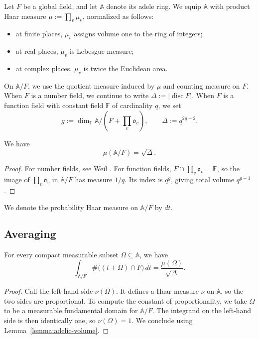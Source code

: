\documentclass[reqno]{amsart} 
\begin{document}
Let $F$ be a global field, and let $\mathbb{A}$ denote its adele ring.  We equip $\mathbb{A}$ with product Haar measure $\mu := \prod_v \mu_v$, normalized as follows:
\begin{itemize}
\item at finite places, $\mu_v$ assigns volume one to the ring of integers;
\item at real places, $\mu_v$ is Lebesgue measure;
\item at complex places, $\mu_v$ is twice the Euclidean area.
\end{itemize}
On $\mathbb{A}/F$, we use the quotient measure induced by $\mu$ and counting measure on $F$.  When $F$ is a number field, we continue to write $\Delta:=|\operatorname{disc}F|$.  When $F$ is a function field with constant field $\mathbb{F}$ of cardinality $q$, we set
\begin{equation*}
  g:=\dim_{\mathbb{F}}\mathbb{A}/\left(F+\prod_v\mathfrak{o}_v\right),
  \qquad \Delta:=q^{2g-2}.
\end{equation*}
\begin{lemma}\label{lemma:adelic-volume}
  We have
  \begin{equation*}
    \mu(\mathbb{A}/F) = \sqrt{\Delta}.
  \end{equation*}
\end{lemma}
\begin{proof}
  For number fields, see Weil \cite[\S2.1.3]{MR670072}.  For function fields, $F\cap\prod_v\mathfrak{o}_v=\mathbb{F}$, so the image of $\prod_v\mathfrak{o}_v$ in $\mathbb{A}/F$ has measure $1/q$.  Its index is $q^g$, giving total volume $q^{g-1}$.
\end{proof}
We denote the probability Haar measure on $\mathbb{A}/F$ by $dt$.

\subsection{Averaging}\label{sec:cus71nhke1}

\begin{lemma}\label{lemma:adelic-averaging}
  For every compact measurable subset $\Omega \subseteq \mathbb{A}$, we have
  \begin{equation*}
    \int_{\mathbb{A}/F}\#\bigl((t + \Omega) \cap F\bigr) \, d t
    = \frac{\mu(\Omega)}{\sqrt\Delta}.
  \end{equation*}
\end{lemma}
\begin{proof}
  Call the left-hand side $\nu(\Omega)$.  It defines a Haar measure $\nu$ on $\mathbb{A}$, so the two sides are proportional.  To compute the constant of proportionality, we take $\Omega$ to be a measurable fundamental domain for $\mathbb{A}/F$.  The integrand on the left-hand side is then identically one, so $\nu(\Omega) = 1$.  We conclude using Lemma~\ref{lemma:adelic-volume}.
\end{proof}
\end{document}

